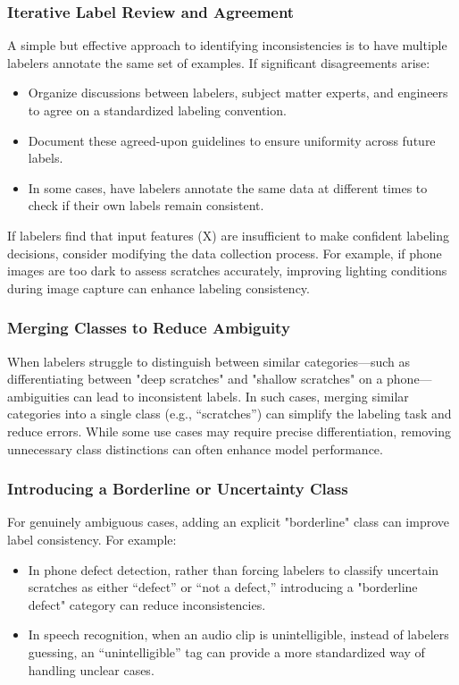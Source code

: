 \documentclass[12pt,openany]{book}
\begin{document}
\subsubsection{Iterative Label Review and Agreement}
A simple but effective approach to identifying inconsistencies is to have multiple labelers annotate the same set of examples. If significant disagreements arise:
\begin{itemize}
    \item Organize discussions between labelers, subject matter experts, and engineers to agree on a standardized labeling convention.
    \item Document these agreed-upon guidelines to ensure uniformity across future labels.
    \item In some cases, have labelers annotate the same data at different times to check if their own labels remain consistent.
\end{itemize}

If labelers find that input features (X) are insufficient to make confident labeling decisions, consider modifying the data collection process. For example, if phone images are too dark to assess scratches accurately, improving lighting conditions during image capture can enhance labeling consistency.

\subsubsection{Merging Classes to Reduce Ambiguity}
When labelers struggle to distinguish between similar categories—such as differentiating between "deep scratches" and "shallow scratches" on a phone—ambiguities can lead to inconsistent labels. In such cases, merging similar categories into a single class (e.g., “scratches”) can simplify the labeling task and reduce errors. While some use cases may require precise differentiation, removing unnecessary class distinctions can often enhance model performance.

\subsubsection{Introducing a Borderline or Uncertainty Class}
For genuinely ambiguous cases, adding an explicit "borderline" class can improve label consistency. For example:
\begin{itemize}
    \item In phone defect detection, rather than forcing labelers to classify uncertain scratches as either “defect” or “not a defect,” introducing a "borderline defect" category can reduce inconsistencies.
    \item In speech recognition, when an audio clip is unintelligible, instead of labelers guessing, an “unintelligible” tag can provide a more standardized way of handling unclear cases.
\end{itemize}
\end{document}
